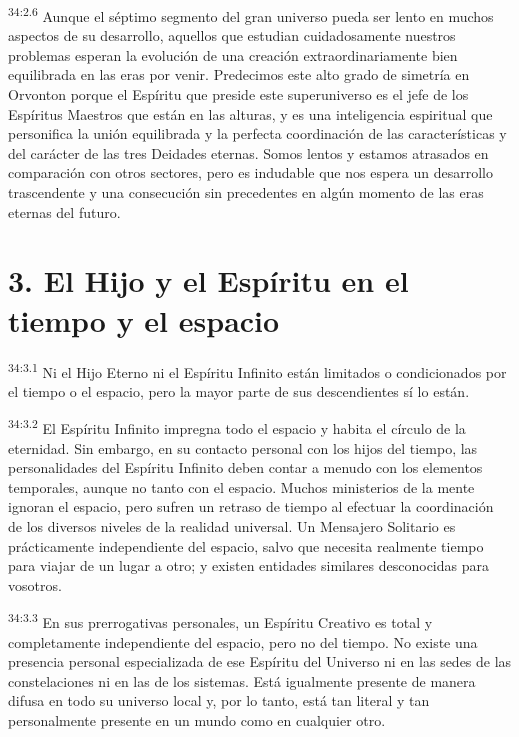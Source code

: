 \par
\textsuperscript{34:2.6} Aunque el séptimo segmento del gran universo pueda ser lento en muchos aspectos de su desarrollo, aquellos que estudian cuidadosamente nuestros problemas esperan la evolución de una creación extraordinariamente bien equilibrada en las eras por venir. Predecimos este alto grado de simetría en Orvonton porque el Espíritu que preside este superuniverso es el jefe de los Espíritus Maestros que están en las alturas, y es una inteligencia espiritual que personifica la unión equilibrada y la perfecta coordinación de las características y del carácter de las tres Deidades eternas. Somos lentos y estamos atrasados en comparación con otros sectores, pero es indudable que nos espera un desarrollo trascendente y una consecución sin precedentes en algún momento de las eras eternas del futuro.

\section*{3. El Hijo y el Espíritu en el tiempo y el espacio}
\par
\textsuperscript{34:3.1} Ni el Hijo Eterno ni el Espíritu Infinito están limitados o condicionados por el tiempo o el espacio, pero la mayor parte de sus descendientes sí lo están.

\par
\textsuperscript{34:3.2} El Espíritu Infinito impregna todo el espacio y habita el círculo de la eternidad. Sin embargo, en su contacto personal con los hijos del tiempo, las personalidades del Espíritu Infinito deben contar a menudo con los elementos temporales, aunque no tanto con el espacio. Muchos ministerios de la mente ignoran el espacio, pero sufren un retraso de tiempo al efectuar la coordinación de los diversos niveles de la realidad universal. Un Mensajero Solitario es prácticamente independiente del espacio, salvo que necesita realmente tiempo para viajar de un lugar a otro; y existen entidades similares desconocidas para vosotros.

\par
\textsuperscript{34:3.3} En sus prerrogativas personales, un Espíritu Creativo es total y completamente independiente del espacio, pero no del tiempo. No existe una presencia personal especializada de ese Espíritu del Universo ni en las sedes de las constelaciones ni en las de los sistemas. Está igualmente presente de manera difusa en todo su universo local y, por lo tanto, está tan literal y tan personalmente presente en un mundo como en cualquier otro.

